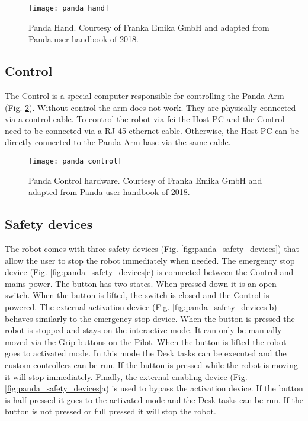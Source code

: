 \begin{figure}[htbp]
    \centering
	\texttt{[image: panda\_hand]}
	\caption[Panda Hand.]{Panda Hand. Courtesy of Franka Emika GmbH and adapted from Panda user handbook of 2018.}
	\label{fig:panda_hand}
\end{figure}


\subsection*{Control}
\label{subsec:robotic_system_physical_description_control}

The Control is a special computer responsible for controlling the Panda Arm (Fig. \ref{fig:panda_control}). Without control the arm does not work. They are physically connected via a control cable. To control the robot via \gls{fci} the Host PC and the Control need to be connected via a RJ-45 ethernet cable. Otherwise, the Host PC can be directly connected to the Panda Arm base via the same cable.

\begin{figure}[htbp]
    \centering
	\texttt{[image: panda\_control]}
	\caption[Panda Control hardware.]{Panda Control hardware. Courtesy of Franka Emika GmbH and adapted from Panda user handbook of 2018.}
	\label{fig:panda_control}
\end{figure}


\subsection*{Safety devices}
\label{subsec:robotic_system_physical_description_safety_devices}

The robot comes with three safety devices (Fig. \ref{fig:panda_safety_devices}) that allow the user to stop the robot immediately when needed. The emergency stop device (Fig. \ref{fig:panda_safety_devices}c) is connected between the Control and mains power. The button has two states. When pressed down it is an open switch. When the button is lifted, the switch is closed and the Control is powered. The external activation device (Fig. \ref{fig:panda_safety_devices}b) behaves similarly to the emergency stop device. When the button is pressed the robot is stopped and stays on the interactive mode. It can only be manually moved via the Grip buttons on the Pilot. When the button is lifted the robot goes to activated mode. In this mode the Desk tasks can be executed and the custom controllers can be run. If the button is pressed while the robot is moving it will stop immediately. Finally, the external enabling device (Fig. \ref{fig:panda_safety_devices}a) is used to bypass the activation device. If the button is half pressed it goes to the activated mode and the Desk tasks can be run. If the button is not pressed or full pressed it will stop the robot.

